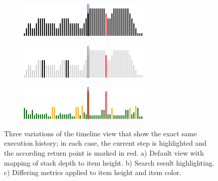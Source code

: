 \begin{figure}[tb]
	\centering
	
	\begin{subfigure}[b]{0.45\textwidth}
		\centering
        \includegraphics[width=\textwidth]{../images/04-ImplTimeline1}
        \caption[Default View]{}
		\label{fig:ApproachTimelineDefault}
	\end{subfigure}
	\quad
	\begin{subfigure}[b]{0.45\textwidth}
		\centering
		\includegraphics[width=\textwidth]{../images/04-ImplTimeline2}
		\caption[Search Result Highlighting]{}
		\label{fig:ApproachTimelineSearch}
	\end{subfigure}
	\quad
	\begin{subfigure}[b]{0.45\textwidth}
		\centering
		\includegraphics[width=\textwidth]{../images/04-ImplTimeline3}
		\caption[Differing Metrics Applied to Item Height and Color]{}
		\label{fig:ApproachTimelineMetrics}
	\end{subfigure}
	
	\caption[Variations of the Timeline View]{Three variations of the timeline view that show the exact same execution history; in each case, the current step is highlighted and the according return point is marked in red.
		a) Default view with mapping of stack depth to item height.
		b) Search result highlighting.
		c) Differing metrics applied to item height and item color.
	}
	\label{fig:ApproachTimeline}
\end{figure}

